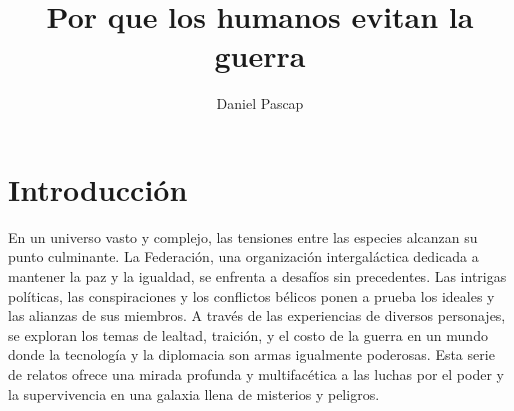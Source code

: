 \documentclass[spanish,12pt,a4paper,oneside,titlepage]{book}
\title{Por que los humanos evitan la guerra}
\author{Daniel Pascap}
\begin{document}
    \maketitle
    \tableofcontents

    \chapter*{Introducción}
    En un universo vasto y complejo, las tensiones entre las especies alcanzan su punto culminante. La Federación, una organización intergaláctica dedicada a mantener la paz y la igualdad, se enfrenta a desafíos sin precedentes. Las intrigas políticas, las conspiraciones y los conflictos bélicos ponen a prueba los ideales y las alianzas de sus miembros. A través de las experiencias de diversos personajes, se exploran los temas de lealtad, traición, y el costo de la guerra en un mundo donde la tecnología y la diplomacia son armas igualmente poderosas. Esta serie de relatos ofrece una mirada profunda y multifacética a las luchas por el poder y la supervivencia en una galaxia llena de misterios y peligros.

    
    
    
    
    
    
    
    
    
    
    
    
    
    
    
    
    
    
    
    
    
    
    
    
    
    
    
\end{document}
